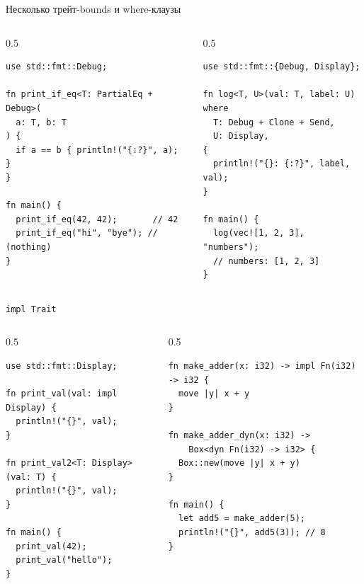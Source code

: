 \documentclass[aspectratio=169]{beamer}
\begin{document}

\begin{frame}[fragile]{Несколько трейт-bounds и where-клаузы}
  \begin{columns}[T, onlytextwidth]
    \setlength{\columnsep}{0pt}
    \begin{column}{0.5\textwidth}
      \begin{verbatim}
use std::fmt::Debug;

fn print_if_eq<T: PartialEq + Debug>(
  a: T, b: T
) {
  if a == b { println!("{:?}", a); }
}

fn main() {
  print_if_eq(42, 42);       // 42
  print_if_eq("hi", "bye"); // (nothing)
}
      \end{verbatim}
    \end{column}
    \begin{column}{0.5\textwidth}
      \begin{verbatim}
use std::fmt::{Debug, Display};

fn log<T, U>(val: T, label: U)
where
  T: Debug + Clone + Send,
  U: Display,
{
  println!("{}: {:?}", label, val);
}

fn main() {
  log(vec![1, 2, 3], "numbers");
  // numbers: [1, 2, 3]
}
      \end{verbatim}
    \end{column}
  \end{columns}
\end{frame}


\begin{frame}[fragile]{\texttt{impl Trait}}
  \begin{columns}[T, onlytextwidth]
    \setlength{\columnsep}{0pt}
    \begin{column}{0.5\textwidth}
      \begin{verbatim}
use std::fmt::Display;

fn print_val(val: impl Display) {
  println!("{}", val);
}

fn print_val2<T: Display>(val: T) {
  println!("{}", val);
}

fn main() {
  print_val(42);
  print_val("hello");
}
      \end{verbatim}
    \end{column}
    \begin{column}{0.5\textwidth}
      \begin{verbatim}
fn make_adder(x: i32) -> impl Fn(i32) -> i32 {
  move |y| x + y
}

fn make_adder_dyn(x: i32) ->
    Box<dyn Fn(i32) -> i32> {
  Box::new(move |y| x + y)
}

fn main() {
  let add5 = make_adder(5);
  println!("{}", add5(3)); // 8
}
      \end{verbatim}
    \end{column}
  \end{columns}
\end{frame}

\end{document}
